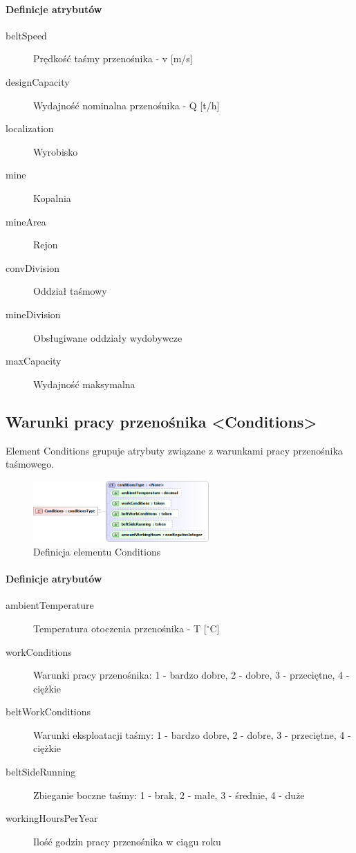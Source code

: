 \documentclass[12pt,a4paper]{article}
\begin{document}
\paragraph{Definicje atrybutów}
\begin{description}
\item[beltSpeed] Prędkość taśmy przenośnika - v [m/s]
\item[designCapacity] Wydajność nominalna przenośnika - Q [t/h]
\item[localization] Wyrobisko
\item[mine] Kopalnia
\item[mineArea] Rejon
\item[convDivision] Oddział taśmowy
\item[mineDivision] Obsługiwane oddziały wydobywcze
\item[maxCapacity] Wydajność maksymalna
\end{description}


\subsection{Warunki pracy przenośnika <Conditions>}
Element Conditions grupuje atrybuty związane z warunkami pracy przenośnika
taśmowego.

\begin{figure}[H]
  \centering
  \includegraphics[width=0.6\textwidth]{png/conditions_xsd2}
  \caption{Definicja elementu Conditions}
  \label{fig:conditions-xsd}
\end{figure}

\paragraph{Definicje atrybutów}
\begin{description}
\item[ambientTemperature] Temperatura otoczenia przenośnika - T [$^\circ$C]
\item[workConditions] Warunki pracy przenośnika: 1 - bardzo dobre, 2 - dobre,
  3 - przeciętne, 4 - ciężkie
\item[beltWorkConditions] Warunki eksploatacji taśmy: 1 - bardzo dobre,
  2 - dobre, 3 - przeciętne, 4 - ciężkie
\item[beltSideRunning] Zbieganie boczne taśmy: 1 - brak, 2 - małe, 3 - średnie,
  4 - duże
\item[workingHoursPerYear] Ilość godzin pracy przenośnika w ciągu roku
\end{description}
\end{document}
